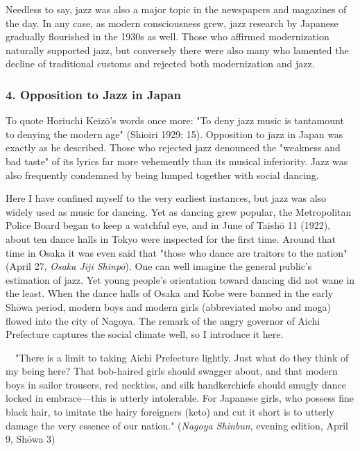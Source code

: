 Needless to say, jazz was also a major topic in the newspapers and magazines of the day. In any case, as modern consciousness grew, jazz research by Japanese gradually flourished in the 1930s as well. Those who affirmed modernization naturally supported jazz, but conversely there were also many who lamented the decline of traditional customs and rejected both modernization and jazz.

\subsubsection{4. Opposition to Jazz in Japan}

To quote Horiuchi Keizō's words once more: "To deny jazz music is tantamount to denying the modern age" (Shioiri 1929: 15). Opposition to jazz in Japan was exactly as he described. Those who rejected jazz denounced the "weakness and bad taste" of its lyrics far more vehemently than its musical inferiority. Jazz was also frequently condemned by being lumped together with social dancing.

Here I have confined myself to the very earliest instances, but jazz was also widely used as music for dancing. Yet as dancing grew popular, the Metropolitan Police Board began to keep a watchful eye, and in June of Taishō 11 (1922), about ten dance halls in Tokyo were inspected for the first time. Around that time in Osaka it was even said that "those who dance are traitors to the nation" (April 27, \textit{Osaka Jiji Shinpō}). One can well imagine the general public's estimation of jazz. Yet young people's orientation toward dancing did not wane in the least. When the dance halls of Osaka and Kobe were banned in the early Shōwa period, modern boys and modern girls (abbreviated mobo and moga) flowed into the city of Nagoya. The remark of the angry governor of Aichi Prefecture captures the social climate well, so I introduce it here.

\begin{gquote}
　"There is a limit to taking Aichi Prefecture lightly. Just what do they think of my being here? That bob-haired girls should swagger about, and that modern boys in sailor trousers, red neckties, and silk handkerchiefs should smugly dance locked in embrace—this is utterly intolerable. For Japanese girls, who possess fine black hair, to imitate the hairy foreigners (keto) and cut it short is to utterly damage the very essence of our nation." (\textit{Nagoya Shinbun}, evening edition, April 9, Shōwa 3)
\end{gquote}

